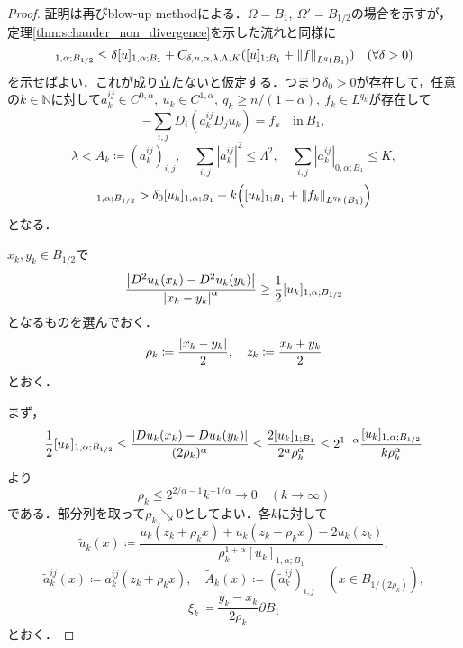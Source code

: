 \documentclass[a4paper]{ltjsarticle}
\newcommand{\Nset}{\mathbb{N}}
\newcommand{\Om}{\Omega}
\newcommand{\inn}{\quad\text{in}\ }
\newcommand{\1}{\mathbbm{1}}
\numberwithin{equation}{section}
\theoremstyle{definition}
\begin{document}
\begin{proof}
    証明は再びblow-up methodによる．$\Om=B_1,\ \Om'=B_{1/2}$の場合を示すが，定理\ref{thm:schauder_non_divergence}を示した流れと同様に
    \begin{equation}
        [u]_{1,\alpha;B_{1/2}}\leq \delta[u]_{1,\alpha;B_{1}}+C_{\delta,n,\alpha,\lambda,\Lambda,K}([u]_{1;B_1}+\norm{f}_{L^q(B_1)})\quad (\forall \delta>0)
    \end{equation}
    を示せばよい．これが成り立たないと仮定する．つまり$\delta_0>0$が存在して，任意の$k\in\Nset$に対して$a^{ij}_k\in C^{0,\alpha},\ u_k\in C^{1,\alpha},\ q_k\geq n/(1-\alpha),\ f_k\in L^{q_k}$が存在して
    \begin{equation}
        -\sum_{i,j}D_i(a^{ij}_kD_ju_k)=f_k\inn B_1,
    \end{equation}
    \begin{equation}
        \lambda<A_k\coloneqq (a^{ij}_k)_{i,j},\quad \sum_{i,j}|a^{ij}_k|^2\leq \Lambda^2,\quad \sum_{i,j}|a^{ij}_{k}|_{0,\alpha;B_1}\leq K, 
    \end{equation}
    \begin{equation}
        [u_k]_{1,\alpha;B_{1/2}}>\delta_0[u_k]_{1,\alpha;B_1}+k\qty([u_k]_{1;B_1}+\norm{f_k}_{L^{q_k}(B_1)})
    \end{equation}
    となる．

    $x_k,y_k\in B_{1/2}$で
    \begin{equation}
        \frac{\abs{D^2u_k(x_k)-D^2u_k(y_k)}}{\abs{x_k-y_k}^\alpha}\geq \frac{1}{2}[u_k]_{1,\alpha;B_{1/2}}
    \end{equation}
    となるものを選んでおく．
    \begin{equation}
        \rho_k\coloneqq \frac{\abs{x_k-y_k}}{2},\quad z_k\coloneqq \frac{x_k+y_k}{2}
    \end{equation}
    とおく．

    まず，
    \begin{equation}
        \frac{1}{2}[u_k]_{1,\alpha;B_{1/2}}\leq\frac{\abs{Du_k(x_k)-Du_k(y_k)}}{(2\rho_k)^\alpha}\leq\frac{2[u_k]_{1;B_1}}{2^\alpha \rho_k^\alpha}\leq 2^{1-\alpha}\frac{[u_k]_{1,\alpha;B_{1/2}}}{k\rho_k^{\alpha}} 
    \end{equation}
    より
    \begin{equation}
        \rho_k\leq 2^{2/\alpha-1}k^{-1/\alpha}\to0 \quad (k\to\infty)
    \end{equation}
    である．部分列を取って$\rho_k\searrow 0$としてよい．各$k$に対して
    \begin{equation}
        \widetilde{u}_k(x)\coloneqq\frac{u_k(z_k+\rho_kx)+u_k(z_k-\rho_kx)-2u_k(z_k)}{\rho_k^{1+\alpha}[u_k]_{1,\alpha;B_{1}}},
    \end{equation}
    \begin{equation}
        \widetilde{a}^{ij}_k(x)\coloneqq a^{ij}_k(z_k+\rho_kx),\quad \widetilde{A}_k(x)\coloneqq (\widetilde{a}^{ij}_k)_{i,j}\quad (x\in B_{1/(2\rho_k)}),
    \end{equation}
    \begin{equation}
        \xi_k\coloneqq \frac{y_k-x_k}{2\rho_k}\partial B_{1}
    \end{equation}
    とおく．


\end{proof}
\end{document}
